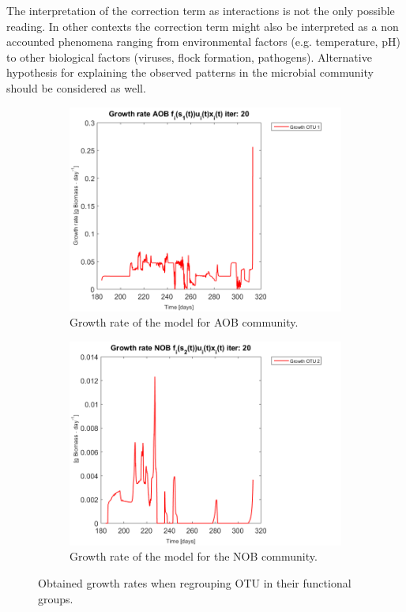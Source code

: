 \documentclass[processes,article,submit,moreauthors,pdftex]{Definitions/mdpi}
\begin{document}
The interpretation of the correction term as interactions is not the only possible reading. In other contexts the correction term might also be interpreted as a non accounted phenomena ranging from environmental factors (e.g. temperature, pH) to other biological factors (viruses, flock formation, pathogens). Alternative hypothesis for explaining the observed patterns in the microbial community should be considered as well. 

\begin{figure}[h]
	\centering
	\begin{subfigure}{0.45 \linewidth}
		\includegraphics[width=\linewidth]{Application/200407_regroup_OTU_try2_iter_20_growth_control_AOB_plot_1}
		\caption{Growth rate of the model for AOB community.}
		\label{AOB_growth_control_application}
	\end{subfigure}
	\begin{subfigure}{0.45 \linewidth}
		\centering
		\includegraphics[width=\linewidth]{Application/200407_regroup_OTU_try2_iter_20_growth_control_NOB_plot_1}
		\caption{Growth rate of the model for the NOB community.}
		\label{NOB_growth_control_application}
	\end{subfigure}
	\caption{Obtained growth rates when regrouping OTU in their functional groups.}
	\label{growth_application}
\end{figure}
\end{document}
